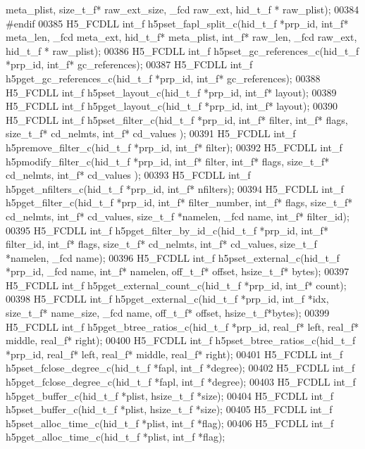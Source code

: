 \begin{DoxyCode}
      meta\_plist, size\_t\_f* raw\_ext\_size, \_fcd raw\_ext, hid\_t\_f * raw\_plist);
00384 \textcolor{preprocessor}{#endif}
00385 H5\_FCDLL int\_f h5pset\_fapl\_split\_c(hid\_t\_f *prp\_id, int\_f* meta\_len, \_fcd meta\_ext, hid\_t\_f* meta\_plist, 
      int\_f* raw\_len, \_fcd raw\_ext, hid\_t\_f * raw\_plist);
00386 H5\_FCDLL int\_f h5pset\_gc\_references\_c(hid\_t\_f *prp\_id, int\_f* gc\_references);
00387 H5\_FCDLL int\_f h5pget\_gc\_references\_c(hid\_t\_f *prp\_id, int\_f* gc\_references);
00388 H5\_FCDLL int\_f h5pset\_layout\_c(hid\_t\_f *prp\_id, int\_f* layout);
00389 H5\_FCDLL int\_f h5pget\_layout\_c(hid\_t\_f *prp\_id, int\_f* layout);
00390 H5\_FCDLL int\_f h5pset\_filter\_c(hid\_t\_f *prp\_id, int\_f* filter, int\_f* flags, size\_t\_f* cd\_nelmts, int\_f* 
      cd\_values );
00391 H5\_FCDLL int\_f h5premove\_filter\_c(hid\_t\_f *prp\_id, int\_f* filter);
00392 H5\_FCDLL int\_f h5pmodify\_filter\_c(hid\_t\_f *prp\_id, int\_f* filter, int\_f* flags, size\_t\_f* cd\_nelmts, int\_f*
       cd\_values );
00393 H5\_FCDLL int\_f h5pget\_nfilters\_c(hid\_t\_f *prp\_id, int\_f* nfilters);
00394 H5\_FCDLL int\_f h5pget\_filter\_c(hid\_t\_f *prp\_id, int\_f* filter\_number, int\_f* flags, size\_t\_f* cd\_nelmts, 
      int\_f* cd\_values, size\_t\_f *namelen, \_fcd name, int\_f* filter\_id);
00395 H5\_FCDLL int\_f h5pget\_filter\_by\_id\_c(hid\_t\_f *prp\_id, int\_f* filter\_id, int\_f* flags, size\_t\_f* cd\_nelmts, 
      int\_f* cd\_values, size\_t\_f *namelen, \_fcd name);
00396 H5\_FCDLL int\_f h5pset\_external\_c(hid\_t\_f *prp\_id, \_fcd name, int\_f* namelen, off\_t\_f* offset, hsize\_t\_f*
      bytes);
00397 H5\_FCDLL int\_f h5pget\_external\_count\_c(hid\_t\_f *prp\_id, int\_f* count);
00398 H5\_FCDLL int\_f h5pget\_external\_c(hid\_t\_f *prp\_id, int\_f *idx, size\_t\_f* name\_size, \_fcd name, off\_t\_f* 
      offset, hsize\_t\_f*bytes);
00399 H5\_FCDLL int\_f h5pget\_btree\_ratios\_c(hid\_t\_f *prp\_id, real\_f* left, real\_f* middle, real\_f* right);
00400 H5\_FCDLL int\_f h5pset\_btree\_ratios\_c(hid\_t\_f *prp\_id, real\_f* left, real\_f* middle, real\_f* right);
00401 H5\_FCDLL int\_f h5pset\_fclose\_degree\_c(hid\_t\_f *fapl, int\_f *degree);
00402 H5\_FCDLL int\_f h5pget\_fclose\_degree\_c(hid\_t\_f *fapl, int\_f *degree);
00403 H5\_FCDLL int\_f h5pget\_buffer\_c(hid\_t\_f *plist, hsize\_t\_f *size);
00404 H5\_FCDLL int\_f h5pset\_buffer\_c(hid\_t\_f *plist, hsize\_t\_f *size);
00405 H5\_FCDLL int\_f h5pset\_alloc\_time\_c(hid\_t\_f *plist, int\_f *flag);
00406 H5\_FCDLL int\_f h5pget\_alloc\_time\_c(hid\_t\_f *plist, int\_f *flag);

\end{DoxyCode}
